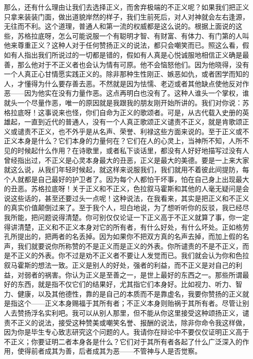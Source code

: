 \documentclass[12pt,oneside]{book}
\begin{document}
那么，还有什么理由让我们去选择正义，而舍弃极端的不正义呢？如果我们把正义只拿来装装门面，做出道貌岸然的样子，我们生前死后，对人对神就会左右逢源，无往而不利。这个道理，普通人和第一流的权威都是这么说的。根据上面说的这些，苏格拉底呀，怎么可能说服一个有聪明才智、有财富、有体力、有门第的人叫他来尊重正义？这种人对于任何赞扬正义的说法，都只会嘲笑而已。照这么看，假如有人指出我们所说过的一切都是错的，假如有人真是心悦诚服地相信正义确是最善，那么他对于不正义者也会认为情有可原。他不会恼怒他们。因为他晓得，没有一个人真正心甘情愿实践正义的。除非那种生性刚正、嫉恶如仇，或者困学而知的人，才懂得为什么要存善去恶。不然就是因为怯懦、老迈或者其他缺点使他反对作恶——因为他实在没有力量作恶。这点再明白也没有了。这种人谁头一个掌权，谁就头一个尽量作恶，唯一的原因就是我跟我的朋友刚开始所讲的。我们对你说：苏格拉底呀！这事说来也怪，你们自命为正义的歌颂者。可是，从古代载入史册的英雄起，一直到近代的普通人，没有一个人真正歌颂正义谴责不正义，就是肯歌颂正义或谴责不正义，也不外乎是从名声、荣誉、利禄这些方面来说的。至于正义或不正义本身是什么？它们本身的力量何在？它们在人的心灵上，当神所不知，人所不见的时候起什么作用？在诗歌里，或者私下谈话里，都没有人好好地描写过没有人曾经指出过，不正义是心灵本身最大的丑恶，正义是最大的美德。要是一上来大家就这么说，从我们年轻时候起，就这样来说服我们，我们就用不着彼此间提防，每个人就都是自己最好的护卫者了。因为每个人都怕干坏事，怕在自己身上出现最大的丑恶。苏格拉底呀！关于正义和不正义，色拉叙马霍斯和其他的人毫无疑问是会说这些话的，甚至还要过头一点呢！这种说法，在我看来，其实是把正义和不正义的真实价值颠倒过来了。至于我个人，坦白地说，为了想听听你的反驳，我已经尽我所能，把问题说得清楚。你可别仅仅论证一下正义高于不正义就算了事，你一定得讲清楚，正义和不正义本身对它的所有者，有什么好处，有什么坏处。正如格劳孔所提出的，把两者的名丢掉。因为如果你不把双方真的名声去掉，而加上假的名声，我们就要说你所称赞的不是正义而是正义的外表。你所谴责的不是不正义，而是不正义的外表。你不过是劝不正义者不要让人发觉而已。我们就会认为你和色拉叙马霍斯的想法一致。正义是别人的好处，强者的利益，而不正义是对自己的利益，对弱者的祸害。你认为正义是至善之一，是世上最好的东西之一。那些所谓最好的东西，就是指不仅它们的结果好，尤其指它们本身好。比如视力、听力、智力、健康，以及其他德性，靠的是自己的本质而不是靠虚名，我要你赞扬的正义就是指这个——正义本身赐福于其所有者；不正义本身则贻祸于其所有者。尽管让别人去赞扬浮名实利吧。我可以从别人那里，但不能从你这里接受这种颂扬正义，谴责不正义的说法，接受这种赞美或嘲笑名誉、报酬的说法，除非你命令我这样做，因为你是毕生专心致志研究这个问题的人。我请你在辩论中不要仅仅证明正义高于不正义；你要证明二者本身各是什么？它们对于其所有者各起了什么广泛深入的作用，使得前者成其为善，后者成其为恶——不管神与人是否觉察。
\end{document}
